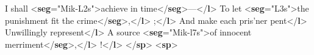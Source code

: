 \begin{shaded}
\mbox{}\newline 
{}I shall {<\textbf{seg}\hspace*{1em}{xml:id}="{Mik-L2s}">}achieve in time{</\textbf{seg}>}—{</\textbf{l}>}\mbox{}\newline 
{}To let {<\textbf{seg}\hspace*{1em}{xml:id}="{L3s}">}the punishment fit the crime{</\textbf{seg}>},{</\textbf{l}>}\mbox{}\newline 
{}\mbox{}\newline 
\hspace*{1em};{</\textbf{l}>}\mbox{}\newline 
{}And make each pris'ner pent{</\textbf{l}>}\mbox{}\newline 
{}Unwillingly represent{</\textbf{l}>}\mbox{}\newline 
{}A source {<\textbf{seg}\hspace*{1em}{xml:id}="{Mik-l7s}">}of innocent merriment{</\textbf{seg}>},{</\textbf{l}>}\mbox{}\newline 
{}\mbox{}\newline 
\hspace*{1em}!{</\textbf{l}>}\mbox{}\newline 
{</\textbf{sp}>}\mbox{}\newline 
{<\textbf{sp}>}\mbox{}\newline 

\end{shaded}
